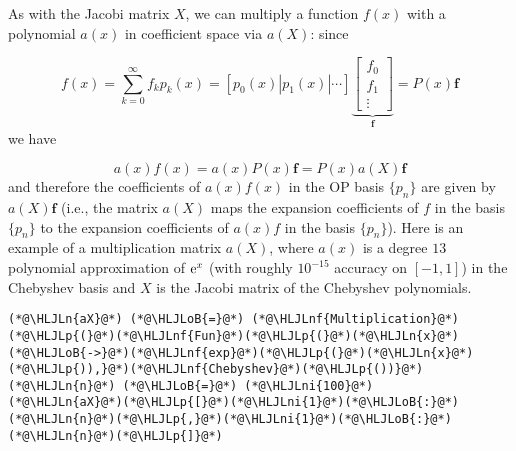 \documentclass[12pt,landscape]{article}
\newcommand{\HLJLn}[1]{#1}
\newcommand{\HLJLnf}[1]{\textcolor[RGB]{66,102,213}{#1}}
\newcommand{\HLJLni}[1]{\textcolor[RGB]{59,151,46}{#1}}
\newcommand{\HLJLoB}[1]{\textcolor[RGB]{102,102,102}{\textbf{#1}}}
\newcommand{\HLJLp}[1]{#1}
\begin{document}
{As with the Jacobi matrix $X$, we can multiply a function $f(x)$ with a polynomial $a(x)$ in coefficient space via $a(X)$: since 

\[
f(x) = \sum_{k = 0}^{\infty} f_k p_k(x) = [p_0(x) | p_1(x) | \ensuremath{\cdots}]\underbrace{\begin{bmatrix}
f_0 \\
f_1 \\
\vdots
\end{bmatrix}}_{\mathbf{f}} = P(x)\mathbf{f}
\]
we have

\[
a(x)f(x) = a(x)P(x)\mathbf{f} = P(x)a(X)\mathbf{f}
\]
and therefore the coefficients of $a(x)f(x)$ in the OP basis $\{ p_n\}$ are given by $a(X)\mathbf{f}$  (i.e., the matrix $a(X)$ maps the expansion coefficients of $f$ in the basis $\{ p_n\}$ to the expansion coefficients of $a(x)f$ in the basis $\{ p_n\}$).  Here is an example of a multiplication matrix $a(X)$, where $a(x)$ is a degree $13$ polynomial approximation of ${\rm e}^{x}$ (with roughly $10^{-15}$ accuracy on $[-1, 1]$) in the Chebyshev basis and $X$ is the Jacobi matrix of the Chebyshev polynomials.


\begin{lstlisting}
(*@\HLJLn{aX}@*) (*@\HLJLoB{=}@*) (*@\HLJLnf{Multiplication}@*)(*@\HLJLp{(}@*)(*@\HLJLnf{Fun}@*)(*@\HLJLp{(}@*)(*@\HLJLn{x}@*)(*@\HLJLoB{->}@*)(*@\HLJLnf{exp}@*)(*@\HLJLp{(}@*)(*@\HLJLn{x}@*)(*@\HLJLp{)),}@*)(*@\HLJLnf{Chebyshev}@*)(*@\HLJLp{())}@*)
(*@\HLJLn{n}@*) (*@\HLJLoB{=}@*) (*@\HLJLni{100}@*)
(*@\HLJLn{aX}@*)(*@\HLJLp{[}@*)(*@\HLJLni{1}@*)(*@\HLJLoB{:}@*)(*@\HLJLn{n}@*)(*@\HLJLp{,}@*)(*@\HLJLni{1}@*)(*@\HLJLoB{:}@*)(*@\HLJLn{n}@*)(*@\HLJLp{]}@*)
\end{lstlisting}

}
\end{document}

